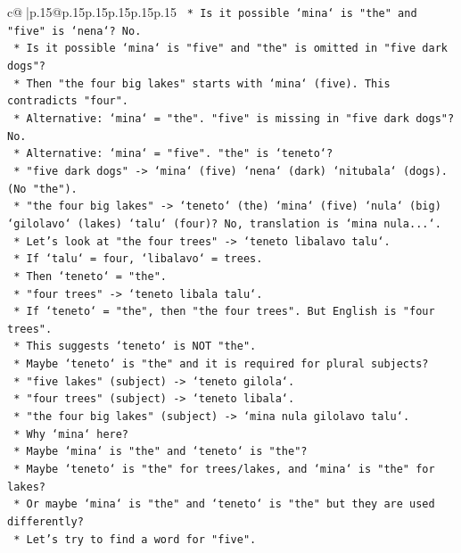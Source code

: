 \documentclass{article}
\begin{document}
{\begin{supertabular}{c@{$\;$}|p{.15\linewidth}@{}p{.15\linewidth}p{.15\linewidth}p{.15\linewidth}p{.15\linewidth}p{.15\linewidth}}
{{{\texttt{        *   Is it possible `mina` is "the" and "five" is `nena`? No.} \\
\texttt{        *   Is it possible `mina` is "five" and "the" is omitted in "five dark dogs"?} \\
\texttt{        *   Then "the four big lakes" starts with `mina` (five). This contradicts "four".} \\
\texttt{    *   Alternative: `mina` = "the". "five" is missing in "five dark dogs"? No.} \\
\texttt{    *   Alternative: `mina` = "five". "the" is `teneto`?} \\
\texttt{        *   "five dark dogs" {-}> `mina` (five) `nena` (dark) `nitubala` (dogs). (No "the").} \\
\texttt{        *   "the four big lakes" {-}> `teneto` (the) `mina` (five) `nula` (big) `gilolavo` (lakes) `talu` (four)? No, translation is `mina nula...`.} \\
\texttt{    *   Let's look at "the four trees" {-}> `teneto libalavo talu`.} \\
\texttt{        *   If `talu` = four, `libalavo` = trees.} \\
\texttt{        *   Then `teneto` = "the".} \\
\texttt{    *   "four trees" {-}> `teneto libala talu`.} \\
\texttt{        *   If `teneto` = "the", then "the four trees". But English is "four trees".} \\
\texttt{        *   This suggests `teneto` is NOT "the".} \\
\texttt{    *   Maybe `teneto` is "the" and it is required for plural subjects?} \\
\texttt{        *   "five lakes" (subject) {-}> `teneto gilola`.} \\
\texttt{        *   "four trees" (subject) {-}> `teneto libala`.} \\
\texttt{        *   "the four big lakes" (subject) {-}> `mina nula gilolavo talu`.} \\
\texttt{        *   Why `mina` here?} \\
\texttt{        *   Maybe `mina` is "the" and `teneto` is "the"?} \\
\texttt{        *   Maybe `teneto` is "the" for trees/lakes, and `mina` is "the" for lakes?} \\
\texttt{        *   Or maybe `mina` is "the" and `teneto` is "the" but they are used differently?} \\
\texttt{    *   Let's try to find a word for "five".} \\
}}}
\end{supertabular}}
\end{document}
